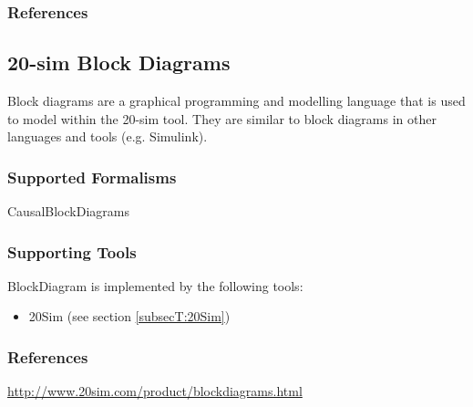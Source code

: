 \subsubsection{References}





\subsection{20-sim Block Diagrams}
\label{subsecL:BlockDiagram}



Block diagrams are a graphical programming and modelling language that is used to model within the 20-sim tool.
They are similar to block diagrams in other languages and tools (e.g. Simulink).


\subsubsection{Supported Formalisms}

CausalBlockDiagrams


\subsubsection{Supporting Tools}

BlockDiagram is implemented by the following tools:
\begin{itemize}
	\item 20Sim (see section \ref{subsecT:20Sim})
\end{itemize}


\subsubsection{References}
\url{http://www.20sim.com/product/blockdiagrams.html}




